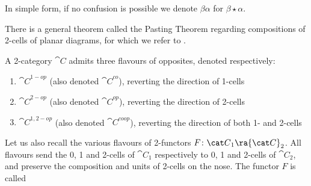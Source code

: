 In simple form, if no confusion is possible we denote $\beta \alpha$ for $\beta \star \alpha$.

There is a general theorem called the Pasting Theorem regarding compositions of 2-cells of planar diagrams, for which we refer to \cite{Power} . 

A 2-category ${\cat C}$ admits three flavours of opposites, denoted respectively:
\begin{enumerate}
\item
${\cat C}^{1-op}$ (also denoted ${\cat C}^{co}$), reverting the direction of 1-cells
\item
${\cat C}^{2-op}$ (also denoted ${\cat C}^{op}$), reverting the direction of 2-cells
\item
${\cat C}^{1,2-op}$ (also denoted ${\cat C}^{coop}$), reverting the direction of both 1- and 2-cells
\end{enumerate}

Let us also recall the various flavours of 2-functors $F \colon {\cat C}_1 \ra {\cat C}_2$. All flavours send the 0, 1 and 2-cells of ${\cat C}_1$ respectively to 0, 1 and 2-cells of ${\cat C}_2$, and preserve the composition and units of 2-cells on the nose. The functor $F$ is called

